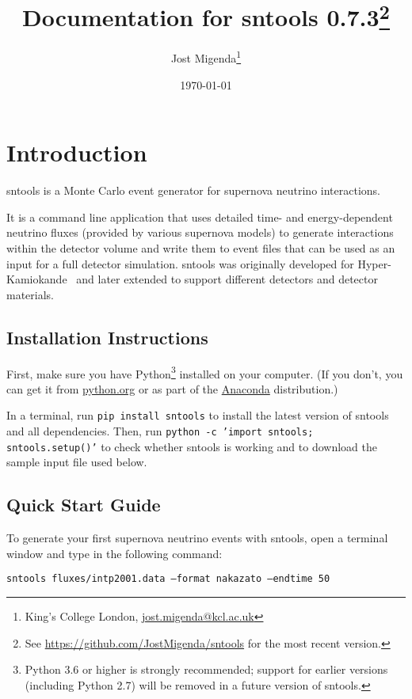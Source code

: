 \documentclass[11pt, oneside]{article}
\title{Documentation for sntools 0.7.3\footnote{See \url{https://github.com/JostMigenda/sntools} for the most recent version.}}
\author{Jost Migenda\footnote{King’s College London, \url{jost.migenda@kcl.ac.uk}}}
\date{\today}
\begin{document}
\maketitle
\setcounter{tocdepth}{2}
\tableofcontents
\clearpage


\section{Introduction}

sntools is a Monte Carlo event generator for supernova neutrino interactions.

It is a command line application that uses detailed time- and energy-dependent neutrino fluxes (provided by various supernova models) to generate interactions within the detector volume and write them to event files that can be used as an input for a full detector simulation.
sntools was originally developed for Hyper-Kamiokande~\cite{Migenda2019} and later extended to support different detectors and detector materials.


\subsection{Installation Instructions}

First, make sure you have Python\footnote{Python 3.6 or higher is strongly recommended; support for earlier versions (including Python 2.7) will be removed in a future version of sntools.} installed on your computer.
(If you don’t, you can get it from \href{https://www.python.org}{python.org} or as part of the \href{https://www.anaconda.com/products/individual}{Anaconda} distribution.)

In a terminal, run \texttt{pip install sntools} to install the latest version of sntools and all dependencies.
Then, run \texttt{python -c 'import sntools; sntools.setup()'} to check whether sntools is working and to download the sample input file used below.


\subsection{Quick Start Guide}

To generate your first supernova neutrino events with sntools, open a terminal window and type in the following command:

\texttt{sntools fluxes/intp2001.data --format nakazato --endtime 50}
\end{document}
